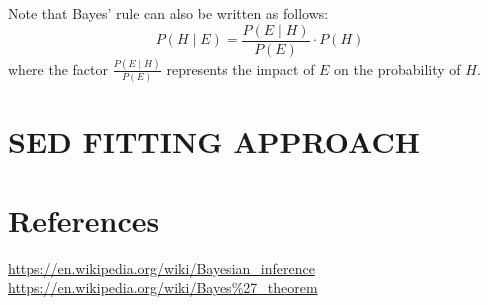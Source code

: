 \documentclass[11pt]{article}
\begin{document}

\noindent
Note that Bayes' rule can also be written as follows:
\begin{equation}
P(H\mid E)={\frac {P(E\mid H)}{P(E)}}\cdot P(H)
\end{equation}
where the factor $\frac {P(E\mid H)}{P(E)}$ represents the impact of
$E$ on the probability of $H$.


\newpage
\section{ SED FITTING APPROACH}
\cite{Ricci16}






\newpage
\section{References}
\href{https://en.wikipedia.org/wiki/Bayesian\_inference}{https://en.wikipedia.org/wiki/Bayesian\_inference}\\
\href{hrefhttps://en.wikipedia.org/wiki/Bayes\%27\_theorem}{https://en.wikipedia.org/wiki/Bayes\%27\_theorem}\\

\citet{Croom04}



\end{document}
